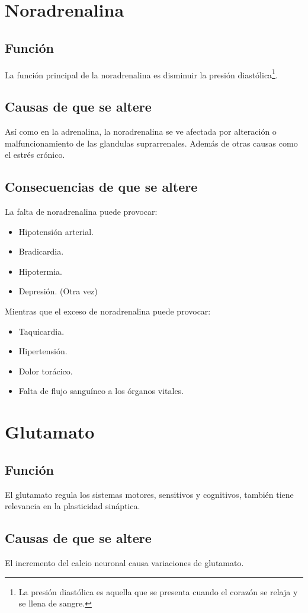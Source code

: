 \begin{multicols}{2}
\section*{Noradrenalina}
\subsection*{Función}
La función principal de la noradrenalina es disminuir la presión diastólica\footnote{La presión diastólica es aquella que se presenta cuando el corazón se relaja y se llena de sangre.}.
\subsection*{Causas de que se altere}
Así como en la adrenalina, la noradrenalina se ve afectada por alteración o malfuncionamiento de las glandulas suprarrenales. Además de otras causas como el estrés crónico.
\subsection*{Consecuencias de que se altere}
La falta de noradrenalina puede provocar:
\begin{itemize}
	\item Hipotensión arterial.
	\item Bradicardia.
	\item Hipotermia.
	\item Depresión. (Otra vez)
\end{itemize}
Mientras que el exceso de noradrenalina puede provocar:
\begin{itemize}
	\item Taquicardia.
	\item Hipertensión.
	\item Dolor torácico.
	\item Falta de flujo sanguíneo a los órganos vitales.
\end{itemize}



\section*{Glutamato}
\subsection*{Función}
El glutamato regula los sistemas motores, sensitivos y cognitivos, también tiene relevancia en la plasticidad sináptica.
\subsection*{Causas de que se altere}
El incremento del calcio neuronal causa variaciones de glutamato.

\end{multicols}
